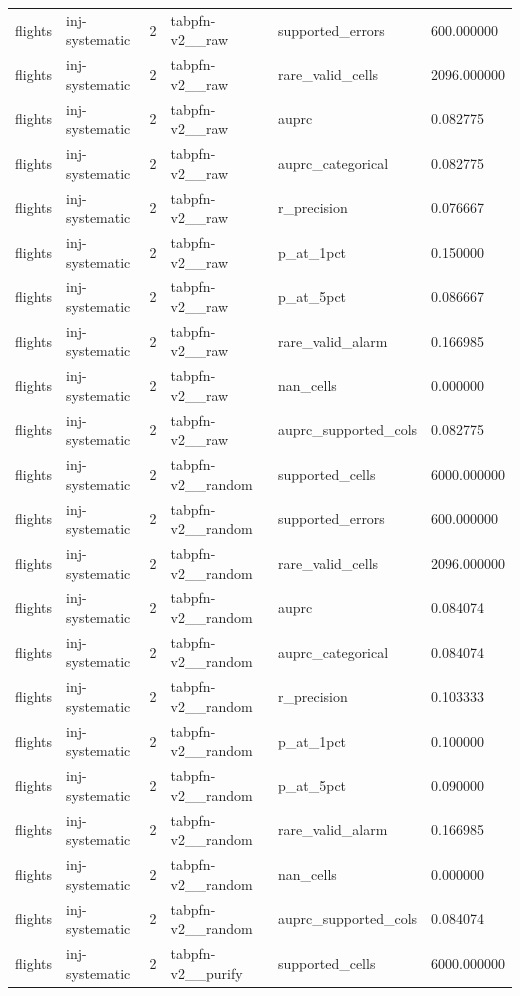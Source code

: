 \begin{tabular}{llllll}
flights & inj-systematic & 2 & tabpfn-v2\_\_raw & supported\_errors & 600.000000 \\
flights & inj-systematic & 2 & tabpfn-v2\_\_raw & rare\_valid\_cells & 2096.000000 \\
flights & inj-systematic & 2 & tabpfn-v2\_\_raw & auprc & 0.082775 \\
flights & inj-systematic & 2 & tabpfn-v2\_\_raw & auprc\_categorical & 0.082775 \\
flights & inj-systematic & 2 & tabpfn-v2\_\_raw & r\_precision & 0.076667 \\
flights & inj-systematic & 2 & tabpfn-v2\_\_raw & p\_at\_1pct & 0.150000 \\
flights & inj-systematic & 2 & tabpfn-v2\_\_raw & p\_at\_5pct & 0.086667 \\
flights & inj-systematic & 2 & tabpfn-v2\_\_raw & rare\_valid\_alarm & 0.166985 \\
flights & inj-systematic & 2 & tabpfn-v2\_\_raw & nan\_cells & 0.000000 \\
flights & inj-systematic & 2 & tabpfn-v2\_\_raw & auprc\_supported\_cols & 0.082775 \\
flights & inj-systematic & 2 & tabpfn-v2\_\_random & supported\_cells & 6000.000000 \\
flights & inj-systematic & 2 & tabpfn-v2\_\_random & supported\_errors & 600.000000 \\
flights & inj-systematic & 2 & tabpfn-v2\_\_random & rare\_valid\_cells & 2096.000000 \\
flights & inj-systematic & 2 & tabpfn-v2\_\_random & auprc & 0.084074 \\
flights & inj-systematic & 2 & tabpfn-v2\_\_random & auprc\_categorical & 0.084074 \\
flights & inj-systematic & 2 & tabpfn-v2\_\_random & r\_precision & 0.103333 \\
flights & inj-systematic & 2 & tabpfn-v2\_\_random & p\_at\_1pct & 0.100000 \\
flights & inj-systematic & 2 & tabpfn-v2\_\_random & p\_at\_5pct & 0.090000 \\
flights & inj-systematic & 2 & tabpfn-v2\_\_random & rare\_valid\_alarm & 0.166985 \\
flights & inj-systematic & 2 & tabpfn-v2\_\_random & nan\_cells & 0.000000 \\
flights & inj-systematic & 2 & tabpfn-v2\_\_random & auprc\_supported\_cols & 0.084074 \\
flights & inj-systematic & 2 & tabpfn-v2\_\_purify & supported\_cells & 6000.000000 \\

\end{tabular}
